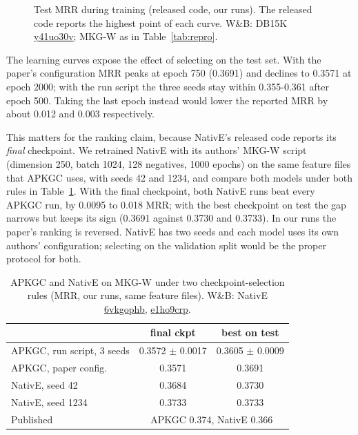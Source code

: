 \documentclass[conference,a4paper]{IEEEtran}
\newcommand{\wb}[2]{\href{https://wandb.ai/nhantrnh-graphml/#1}{{\normalfont\ttfamily #2}}}
\begin{document}
\begin{figure}[!t]
\centering
\resizebox{\columnwidth}{!}{}
\caption{Test MRR during training (released code, our runs). The released code reports the highest point of each curve. W\&B: DB15K \wb{apkgc-repro/runs/y41uo30v}{y41uo30v}; MKG-W as in Table~\ref{tab:repro}.}
\label{fig:curves}
\end{figure}

The learning curves expose the effect of selecting on the test set. With the paper's
configuration MRR peaks at epoch 750 (0.3691) and declines to 0.3571 at epoch 2000; with
the run script the three seeds stay within 0.355-0.361 after epoch 500. Taking the last
epoch instead would lower the reported MRR by about 0.012 and 0.003 respectively.

This matters for the ranking claim, because NativE's released code reports its
\emph{final} checkpoint. We retrained NativE with its authors' MKG-W script (dimension 250,
batch 1024, 128 negatives, 1000 epochs) on the same feature files that APKGC uses, with
seeds 42 and 1234, and compare both models under both rules in Table~\ref{tab:native}.
With the final checkpoint, both NativE runs beat every APKGC run, by 0.0095 to 0.018 MRR;
with the best checkpoint on test the gap narrows but keeps its sign (0.3691 against 0.3730
and 0.3733). In our runs the paper's ranking is reversed. NativE has two seeds and each
model uses its own authors' configuration; selecting on the validation split would be the
proper protocol for both.

\begin{table}[!t]
\centering
\caption{APKGC and NativE on MKG-W under two checkpoint-selection rules (MRR, our runs, same feature files). W\&B: NativE \wb{apkgc-repro/runs/6vkgophb}{6vkgophb}, \wb{apkgc-repro/runs/e1ho9crp}{e1ho9crp}.}
\label{tab:native}
\small
\setlength{\tabcolsep}{3pt}
\begin{tabular}{lcc}
\toprule
 & final ckpt & best on test\\
\midrule
APKGC, run script, 3 seeds & 0.3572 $\pm$ 0.0017 & 0.3605 $\pm$ 0.0009\\
APKGC, paper config. & 0.3571 & 0.3691\\
NativE, seed 42 & 0.3684 & 0.3730\\
NativE, seed 1234 & 0.3733 & 0.3733\\
\midrule
Published~\cite{apkgc} & \multicolumn{2}{c}{APKGC 0.374, NativE 0.366}\\
\bottomrule
\end{tabular}
\end{table}
\end{document}
